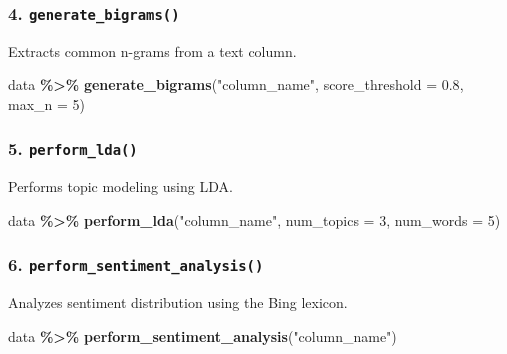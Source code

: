 \documentclass[
]{article}
\newenvironment{Shaded}{\begin{snugshade}}{\end{snugshade}}
\newcommand{\AttributeTok}[1]{\textcolor[rgb]{0.13,0.29,0.53}{#1}}
\newcommand{\DecValTok}[1]{\textcolor[rgb]{0.00,0.00,0.81}{#1}}
\newcommand{\FloatTok}[1]{\textcolor[rgb]{0.00,0.00,0.81}{#1}}
\newcommand{\FunctionTok}[1]{\textcolor[rgb]{0.13,0.29,0.53}{\textbf{#1}}}
\newcommand{\NormalTok}[1]{#1}
\newcommand{\SpecialCharTok}[1]{\textcolor[rgb]{0.81,0.36,0.00}{\textbf{#1}}}
\newcommand{\StringTok}[1]{\textcolor[rgb]{0.31,0.60,0.02}{#1}}
\begin{document}
\subsubsection{\texorpdfstring{4.
\texttt{generate\_bigrams()}}{4. generate\_bigrams()}}\label{generate_bigrams}

Extracts common n-grams from a text column.

\begin{Shaded}
\begin{Highlighting}[]
\NormalTok{data }\SpecialCharTok{\%\textgreater{}\%} \FunctionTok{generate\_bigrams}\NormalTok{(}\StringTok{"column\_name"}\NormalTok{, }\AttributeTok{score\_threshold =} \FloatTok{0.8}\NormalTok{, }\AttributeTok{max\_n =} \DecValTok{5}\NormalTok{)}
\end{Highlighting}
\end{Shaded}

\subsubsection{\texorpdfstring{5.
\texttt{perform\_lda()}}{5. perform\_lda()}}\label{perform_lda}

Performs topic modeling using LDA.

\begin{Shaded}
\begin{Highlighting}[]
\NormalTok{data }\SpecialCharTok{\%\textgreater{}\%} \FunctionTok{perform\_lda}\NormalTok{(}\StringTok{"column\_name"}\NormalTok{, }\AttributeTok{num\_topics =} \DecValTok{3}\NormalTok{, }\AttributeTok{num\_words =} \DecValTok{5}\NormalTok{)}
\end{Highlighting}
\end{Shaded}

\subsubsection{\texorpdfstring{6.
\texttt{perform\_sentiment\_analysis()}}{6. perform\_sentiment\_analysis()}}\label{perform_sentiment_analysis}

Analyzes sentiment distribution using the Bing lexicon.

\begin{Shaded}
\begin{Highlighting}[]
\NormalTok{data }\SpecialCharTok{\%\textgreater{}\%} \FunctionTok{perform\_sentiment\_analysis}\NormalTok{(}\StringTok{"column\_name"}\NormalTok{)}
\end{Highlighting}
\end{Shaded}
\end{document}
